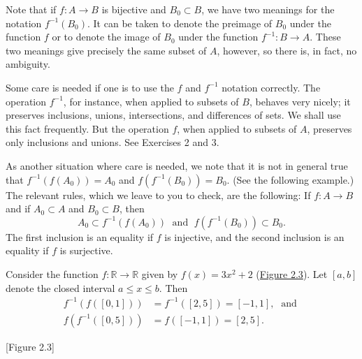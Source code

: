 Note that if \(f : A \rightarrow B\) is bijective and \(B_{0} \subset B\), 
we have two meanings for the notation \(f^{-1}(B_{0})\). It can be taken to 
denote the preimage of \(B_{0}\) under the function \(f\) or to denote the image 
of \(B_{0}\) under the function \(f^{-1} : B \rightarrow A\). 
These two meanings give precisely the same subset of \(A\), 
however, so there is, in fact, no ambiguity.

Some care is needed if one is to use the \(f\) and \(f^{-1}\) notation correctly. 
The operation \(f^{-1}\), for instance, when applied to subsets of \(B\), 
behaves very nicely; it preserves inclusions, unions, intersections, 
and differences of sets. We shall use this fact frequently. 
But the operation \(f\), when applied to subsets of \(A\), 
preserves only inclusions and unions. See Exercises 2 and 3.

As another situation where care is needed, 
we note that it is not in general true that \(f^{-1}({f(A_{0}) }) = A_{0}\) 
and \(f({f^{-1}(B_{0}) }) = B_{0}\). (See the following example.) 
The relevant rules, which we leave to you to check, are the following: 
If \(f : A \rightarrow B\) and if \(A_{0} \subset A\) and \(B_{0} \subset B\), then
\[
A_{0} \subset {f}^{-1}({f(A_{0}) }) \;\text{ and }\;f({f^{-1}(B_{0}) }) \subset {B}_{0}.
\]
The first inclusion is an equality if \(f\) is injective, 
and the second inclusion is an equality if \(f\) is surjective.

\begin{centeredblock}
 \begin{example}
\label{ex:\thesection.\theexample}
 Consider the function \(f : \mathbb{R} \rightarrow \mathbb{R}\) given by \(f(x) = 3x^{2} + 2\) (\hyperref[fig:2.3]{Figure 2.3}). Let \([{a,b}]\) denote the closed interval \(a \leq x \leq b\). Then
 \[
 \begin{aligned}
  f^{-1}({f( [{0,1}] ) }) &= f^{-1}( [{2,5}] ) = [{-1,1}] ,\;\text{ and } \\
  f({f^{-1}( [{0,5}] ) }) &= f( [{-1,1}] ) = [{2,5}] .
 \end{aligned}
 \]
 \end{example}
\end{centeredblock}

[Figure 2.3]

